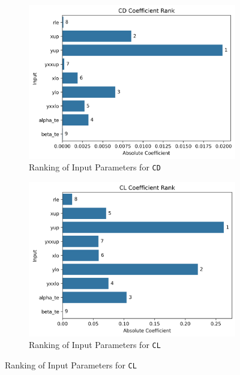 \documentclass[conf]{new-aiaa}
\begin{document}
\begin{figure}[H]
    \centering

    \begin{subfigure}{0.45\textwidth}
        \centering
        \includegraphics[width=1.0\textwidth]{graph/case2_cd_coef_rank.png}
        \caption{\label{fig:case2_ranking_cd}Ranking of Input Parameters for \texttt{CD}}
    \end{subfigure}
    \hfill
    \begin{subfigure}{0.45\textwidth}
        \centering
        \includegraphics[width=1.0\textwidth]{graph/case2_cl_coef_rank.png}
        \caption{\label{fig:case2_ranking_cl}Ranking of Input Parameters for \texttt{CL}}
    \end{subfigure}

\end{figure}
\end{document}
